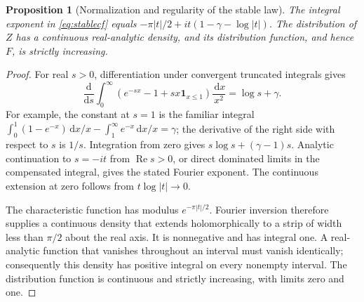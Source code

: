 \documentclass[11pt,a4paper]{article}
\numberwithin{equation}{section}
\newtheorem{proposition}[theorem]{Proposition}
\theoremstyle{definition}
\theoremstyle{remark}
\newcommand{\dd}{\,\mathrm d}
\newcommand{\ind}{\mathbf1}
\DeclareMathOperator{\Rea}{Re}
\begin{document}
\begin{proposition}[Normalization and regularity of the stable law]
\label{prop:stable}
The integral exponent in \eqref{eq:stablecf} equals
$-\pi|t|/2+it(1-\gamma-\log|t|)$. The distribution of $Z$ has a continuous
real-analytic density, and its distribution function, and hence $F$, is
strictly increasing.
\end{proposition}
\begin{proof}
For real $s>0$, differentiation under convergent truncated integrals gives
\[
 \frac{\mathrm d}{\mathrm ds}
 \int_0^\infty(e^{-sx}-1+sx\ind_{x\le1})\frac{\dd x}{x^2}
 =\log s+\gamma.
\]
For example, the constant at $s=1$ is the familiar integral
$\int_0^1(1-e^{-x})\dd x/x-\int_1^\infty e^{-x}\dd x/x=\gamma$;
the derivative of the right side with respect to $s$ is $1/s$.
Integration from zero gives $s\log s+(\gamma-1)s$.
Analytic continuation to $s=-it$ from $\Rea s>0$, or direct dominated
limits in the compensated integral, gives the stated Fourier exponent.
The continuous extension at zero follows from $t\log|t|\to0$.

The characteristic function has modulus $e^{-\pi|t|/2}$. Fourier
inversion therefore supplies a continuous density that extends
holomorphically to a strip of width less than $\pi/2$ about the real axis.
It is nonnegative and has integral one. A real-analytic function that
vanishes throughout an interval must vanish identically; consequently this
density has positive integral on every nonempty interval. The distribution
function is continuous and strictly increasing, with limits zero and one.
\end{proof}
\end{document}
